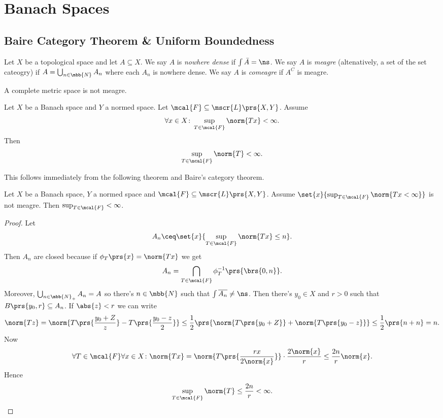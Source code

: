 \documentclass[10pt, twoside]{book}
\begin{document}
\section{Banach Spaces}

\subsection{Baire Category Theorem \& Uniform Boundedness}

\begin{definition}
Let $X$ be a topological space and let $A \subseteq X$.
We say $A$ is \emph{nowhere dense} if $\int \bar{A} = \ns$.
We say $A$ is \emph{meagre} (altenatively, a set of the set cateogry) if $A = \bigcup_{n \in \mbb{N}} A_n$ where each $A_n$ is nowhere dense.
We say $A$ is \emph{comeagre} if $A^C$ is meagre.
\end{definition}

\begin{theorem}[Baire]
A complete metric space is not meagre.
\end{theorem}

\begin{theorem}
Let $X$ be a Banach space and $Y$ a normed space. Let $\mcal{F} \subseteq \mscr{L}\prs{X,Y}$.
Assume
\[\forall x \in X \colon \sup_{T \in \mcal{F}} \norm{Tx} < \infty \text{.}\]
Then
\[\sup_{T \in \mcal{F}} \norm{T} < \infty \text{.}\]
\end{theorem}

This follows immediately from the following theorem and Baire's category theorem.

\begin{theorem}
Let $X$ be a Banach space, $Y$ a normed space and $\mcal{F} \subseteq \mscr{L}\prs{X,Y}$. Assume $\set{x}{\sup_{T \in \mcal{F}} \norm{{T x} < \infty}}$ is not meagre. Then $\sup_{T \in \mcal{F}} < \infty$.
\end{theorem}

\begin{proof}
Let
\[A_n \ceq \set{x}{\sup_{T \in \mcal{F}} \norm{Tx} \leq n} \text{.}\]
Then $A_n$ are closed because if $\phi_T\prs{x} = \norm{Tx}$ we get \[A_n = \bigcap_{T \in \mcal{F}} \phi_T^{-1} \prs{\brs{0,n}} \text{.}\]
Moreover, $\bigcup_{n \in \mbb{N}_+} A_n = A$ so there's $n \in \mbb{N}$ such that $\int \overline{A_n} \neq \ns$. Then there's $y_0 \in X$ and $r > 0$ such that $B\prs{y_0, r} \subseteq A_n$.
If $\abs{z} < r$ we can write
\[\norm{Tz} = \norm{T \prs{\frac{y_0 + Z}{z}} - T \prs{\frac{y_0 - z}{2}}} \leq \frac{1}{2} \prs{\norm{T \prs{y_0 + Z}} + \norm{T \prs{y_0 - z}}} \leq \frac{1}{2} \prs{n+n} = n \text{.}\]
Now
\[\forall T \in \mcal{F} \forall x \in X \colon \norm{Tx} = \norm{T \prs{\frac{r x}{2 \norm{x}}}} \cdot \frac{2 \norm{x}}{r} \leq \frac{2n}{r} \norm{x} \text{.}\]
Hence
\[\sup_{T \in \mcal{F}} \norm{T} \leq \frac{2n}{r} < \infty \text{.}\]
\end{proof}
\end{document}
